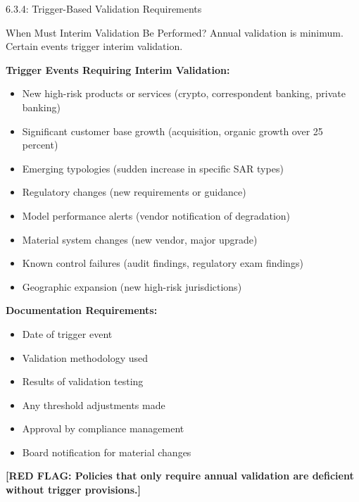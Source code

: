 \documentclass[11pt,a4paper]{beamer}
\newcommand{\redflag}[1]{\textcolor{red!80!black}{\textbf{[RED FLAG: #1]}}}
\begin{document}
\begin{frame}{6.3.4: Trigger-Based Validation Requirements}
	\begin{block}{When Must Interim Validation Be Performed?}
		Annual validation is minimum. Certain events trigger interim validation.
	\end{block}
	\textbf{Trigger Events Requiring Interim Validation:}
	\begin{itemize}
		\item New high-risk products or services (crypto, correspondent banking, private banking)
		\item Significant customer base growth (acquisition, organic growth over 25 percent)
		\item Emerging typologies (sudden increase in specific SAR types)
		\item Regulatory changes (new requirements or guidance)
		\item Model performance alerts (vendor notification of degradation)
		\item Material system changes (new vendor, major upgrade)
		\item Known control failures (audit findings, regulatory exam findings)
		\item Geographic expansion (new high-risk jurisdictions)
	\end{itemize}
	\textbf{Documentation Requirements:}
	\begin{itemize}
		\item Date of trigger event
		\item Validation methodology used
		\item Results of validation testing
		\item Any threshold adjustments made
		\item Approval by compliance management
		\item Board notification for material changes
	\end{itemize}
	\redflag{Policies that only require annual validation are deficient without trigger provisions.}
\end{frame}
\end{document}

